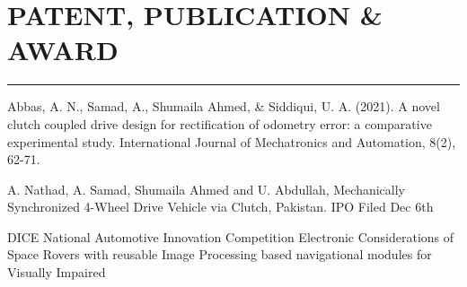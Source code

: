 \documentclass[9pt]{ShumailaAhmed-Resume}
\begin{document}
\begin{minipage}[t]{0.66\textwidth}
\section{\hspace{190pt} \large PATENT, PUBLICATION \& AWARD }
\noindent\rule{12.5cm}{0.1pt}
\vspace{5pt}
 \runsubsection{}
\noindent
\hspace{5em}%
\begin{minipage}{0.85\textwidth\vspace{1pt}}
{\small Abbas, A. N., Samad, A., Shumaila Ahmed, \& Siddiqui, U. A. (2021).
A novel clutch coupled drive design for rectification of odometry error: a comparative experimental study. International Journal of Mechatronics and Automation, 8(2), 62-71.}
\end{minipage}

\vspace{5pt}
 \runsubsection{}
\noindent
\hspace{5em}
\begin{minipage}{0.85\textwidth\vspace{1pt}}
{\small A. Nathad, A. Samad, Shumaila Ahmed and U. Abdullah, Mechanically
Synchronized 4-Wheel Drive Vehicle via Clutch, Pakistan.
IPO Filed Dec 6th}
\end{minipage}
 \runsubsection{}
\noindent
\hspace{5em}%
\begin{minipage}{0.85\textwidth\vspace{1pt}}
{\small DICE National Automotive Innovation Competition
Electronic Considerations of Space Rovers with reusable Image Processing
based navigational modules for Visually Impaired}
\end{minipage}


\end{minipage}
\end{document}
